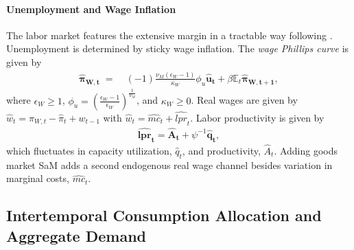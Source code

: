 \documentclass[12pt,3p,authoryear,review]{elsarticle}
\begin{document}
\paragraph{Unemployment and Wage Inflation}%
The labor market features the extensive margin in a tractable way following \cite{gali2011unemployment}. Unemployment is determined by sticky wage inflation. The \emph{wage Phillips curve} is given by%
\begin{align}%
	\boldsymbol{\hat{\pi}_{W,t}} \; = & \; (-1) \frac{\nu_M \left(\epsilon_W-1\right)}{\kappa_W} \phi_u \boldsymbol{\hat{u}_t} + \beta \mathbb{E}_t \boldsymbol{\hat{\pi}_{W,t+1}},\label{eq:lin_wage_phillips}%
\end{align}%
where $\epsilon_W\geq1$, $\phi_u = \left(\frac{\epsilon_W-1}{\epsilon_W}\right)^{\frac{1}{\nu_M}}$, and $\kappa_W\geq0$. Real wages are given by $\hat{w}_t = \hat{\pi}_{W,t} - \hat{\pi}_t + w_{t-1}$ with $\hat{w}_t = \hat{mc}_t+\hat{lpr}_t$. Labor productivity is given by%
\begin{align}%
	\boldsymbol{\hat{lpr}_t} = \boldsymbol{\hat{A}_t} + \psi^{-1} \boldsymbol{\hat{q}_t},%
\end{align}%
which fluctuates in capacity utilization, $\hat{q}_t$, and productivity, $\hat{A}_t$. Adding goods market SaM adds a second endogenous real wage channel besides variation in marginal costs, $\hat{mc}_t$.%
\subsection{Intertemporal Consumption Allocation and Aggregate Demand}%
\end{document}
